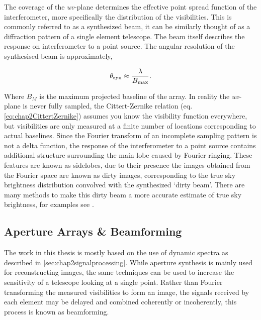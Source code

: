 The coverage of the $uv$-plane determines the effective point spread function of the interferometer, more specifically the distribution of the visibilities. This is commonly referred to as a synthesized beam, it can be similarly thought of as a diffraction pattern of a single element telescope. The beam itself describes the response on interferometer to a point source. The angular resolution of the synthesised beam is approximately, 

\begin{equation}
\theta_{\rm syn} \approx \frac{\lambda}{B_{\text{max}}}.
\end{equation}

Where $B_M$ is the maximum projected baseline of the array. In reality the $uv$-plane is never fully sampled, the Cittert-Zernike relation (eq. \ref{eq:chap2CittertZernike}) assumes you know the visibility function everywhere, but visibilities are only measured at a finite number of locations corresponding to actual baselines.  Since the Fourier transform of an incomplete sampling pattern is not a delta function, the response of the interferometer to a point source contains additional structure surrounding the main lobe caused by Fourier ringing. These features are known as sidelobes, due to their presence the images obtained from the Fourier space are known as dirty images, corresponding to the true sky brightness distribution convolved with the synthesized `dirty beam'. There are many methods to make this dirty beam a more accurate estimate of true sky brightness, for examples see \citet[pp. 202-220,]{WilsonToolsofRadioastron}. 

\subsection{Aperture Arrays \& Beamforming}

The work in this thesis is mostly based on the use of dynamic spectra as described in \cref{sec:chap2signalprocessing}. While aperture synthesis is mainly used for reconstructing images, the same techniques can be used to increase the sensitivity of a telescope looking at a single point. Rather than Fourier transforming the measured visibilities to form an image, the signals received by each element may be delayed and combined coherently or incoherently, this process is known as beamforming. \\ 

